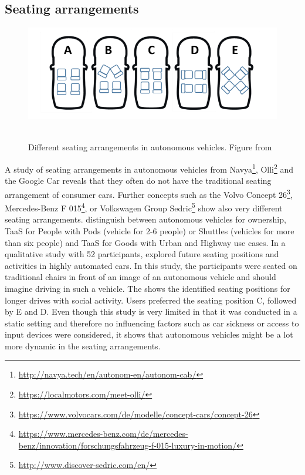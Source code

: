 \subsection{Seating arrangements}\label{ssec:seating}
\begin{figure}
    \includegraphics[width=1\textwidth]{fig/seating}\hfill\
    \caption[Seating arrangements]{Different seating arrangements in autonomous vehicles. Figure from \cite{Jorlov2017}}
    \label{fig:seating}
\end{figure}
A study of seating arrangements in autonomous vehicles from Navya\footnote{\url{http://navya.tech/en/autonom-en/autonom-cab/}}, Olli\footnote{\url{https://localmotors.com/meet-olli/}} and the Google Car reveals that they often do not have the traditional seating arrangement of consumer cars. Further concepts such as the Volvo Concept 26\footnote{\url{https://www.volvocars.com/de/modelle/concept-cars/concept-26}}, Mercedes-Benz F 015\footnote{\url{https://www.mercedes-benz.com/de/mercedes-benz/innovation/forschungsfahrzeug-f-015-luxury-in-motion/}}, or Volkswagen Group Sedric\footnote{\url{http://www.discover-sedric.com/en/}} show also very different seating arrangements.  \citet{Jungwirth2017LeadershipGroup} distinguish between autonomous vehicles for ownership, TaaS for People with Pods (vehicle for 2-6 people) or Shuttles (vehicles for more than six people) and TaaS for Goods with Urban and Highway use cases. In a qualitative study with 52 participants, \citet{Jorlov2017} explored future seating positions and activities in highly automated cars. In this study, the participants were seated on traditional chairs in front of an image of an autonomous vehicle and should imagine driving in such a vehicle. The \emph{} shows the identified seating positions for longer drives with social activity. Users preferred the seating position C, followed by E and D. Even though this study is very limited in that it was conducted in a static setting and therefore no influencing factors such as car sickness or access to input devices were considered, it shows that autonomous vehicles might be a lot more dynamic in the seating arrangements.  

